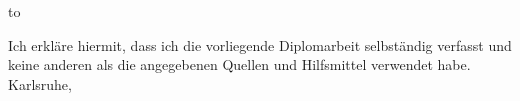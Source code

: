 
\pagestyle{empty}
\vspace*{32\baselineskip}
\hbox to \textwidth{\hrulefill}
\par
\hfill \newline
Ich erkläre hiermit, dass ich die vorliegende Diplomarbeit selbständig verfasst und
keine anderen als die angegebenen Quellen und Hilfsmittel verwendet habe.
\hfill \newline \newline
Karlsruhe, \mysubmissiondate
\hfill
\myname

\clearpage

\pagestyle{plain}